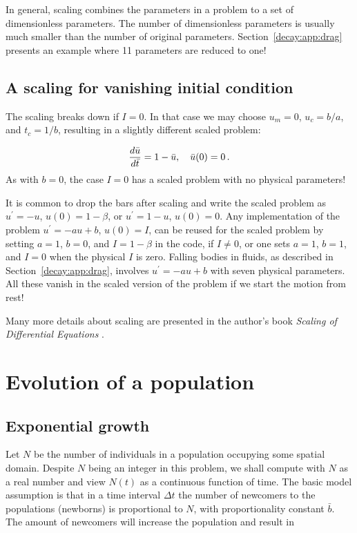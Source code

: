 \documentclass[%
oneside,                 %
final,                   %
10pt]{article}
\begin{document}
In general, scaling combines the parameters in a problem to a set
of dimensionless parameters. The number of dimensionless parameters is
usually much smaller than the number of original parameters.
Section~\ref{decay:app:drag} presents an example where 11 parameters
are reduced to one!

\subsection{A scaling for vanishing initial condition}

The scaling breaks down if $I=0$. In that case we may choose $u_m=0$,
$u_c=b/a$, and $t_c=1/b$, resulting in a slightly different scaled problem:

\[ \frac{d\bar u}{d\bar t} = 1 -\bar u,\quad \bar u(0)=0\tp\]
As with $b=0$, the case $I=0$ has a scaled problem with no physical
parameters!

It is common to drop the bars after scaling and write the scaled
problem as $u^{\prime}=-u$, $u(0)=1-\beta$, or $u^{\prime}=1-u$, $u(0)=0$.
Any implementation of the problem $u^{\prime}=-au+b$, $u(0)=I$, can be
reused for the scaled problem by setting $a=1$, $b=0$, and $I=1-\beta$
in the code, if $I\neq 0$, or one sets
$a=1$, $b=1$, and $I=0$ when the physical $I$ is zero.
Falling bodies in fluids, as described in Section~\ref{decay:app:drag},
involves $u^{\prime}=-au+b$ with seven physical parameters. All these vanish
in the scaled version of the problem if we start the motion from rest!

Many more details about scaling are presented in the author's book
\emph{Scaling of Differential Equations} \cite{Langtangen_scaling}.

\section{Evolution of a population}
\label{decay:app:pop}


\subsection{Exponential growth}
\label{decay:app:pop:exp}

Let $N$ be the number of individuals in a population occupying some
spatial domain.  Despite $N$ being an integer in this problem, we
shall compute with $N$ as a real number and view $N(t)$ as a
continuous function of time.  The basic model assumption is that in a
time interval $\Delta t$ the number of newcomers to the populations
(newborns) is proportional to $N$, with proportionality constant $\bar
b$. The amount of newcomers will increase the population and result in
\end{document}
